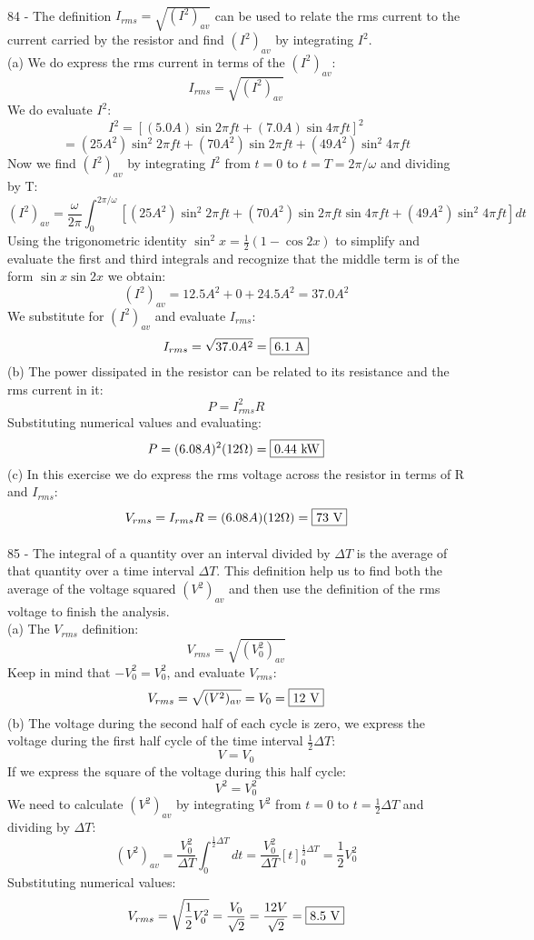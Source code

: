 \documentclass{report}
\begin{document}
\paragraph{}
84 - The definition $I_{rms} = \sqrt{(I^2)_{av}}$ can be used to relate the rms current to the current carried by the resistor and find $(I^2)_{av}$ by integrating $I^2$.\\
(a) We do express the rms current in terms of the $(I^2)_{av}$:
$$I_{rms} = \sqrt{(I^2)_{av}}$$
We do evaluate $I^2$:
$$I^2 = [(5.0 A) \sin 2 \pi ft + (7.0 A) \sin 4 \pi ft]^2$$
$$= (25 A^2) \sin^2 2 \pi ft + (70 A^2) \sin 2 \pi ft + (49 A^2) \sin^2 4 \pi ft$$
Now we find $(I^2)_{av}$ by integrating $I^2$ from $t =0$ to $t = T = 2 \pi / \omega$ and dividing by T:
$$(I^2)_{av} = \frac{\omega}{2 \pi}\int_0^{2 \pi / \omega}[(25 A^2) \sin^2 2 \pi ft + (70 A^2) \sin 2 \pi ft \sin 4 \pi ft + (49 A^2) \sin^2 4 \pi ft]dt$$
Using the trigonometric identity $\sin^2 x = \frac{1}{2}(1 - \cos 2x)$ to simplify and evaluate the first and third integrals and recognize that the middle term is of the form $\sin x \sin 2x$ we obtain:
$$(I^2)_{av} = 12.5 A^2 + 0 + 24.5 A^2 = 37.0 A^2$$
We substitute for $(I^2)_{av}$ and evaluate $I_{rms}$:
$$I_{rms} = \sqrt{37.0 A^2} = \fbox{6.1 A}$$
(b) The power dissipated in the resistor can be related to its resistance and the rms current in it:
$$P = I_{rms}^2 R$$
Substituting numerical values and evaluating:
$$P = (6.08 A)^2(12 \Omega) = \fbox{0.44 kW}$$
(c) In this exercise we do express the rms voltage across the resistor in terms of R and $I_{rms}$:
$$V_{rms} = I_{rms}R = (6.08 A)(12 \Omega) = \fbox{73 V}$$

\paragraph{}
85 - The integral of a quantity over an interval divided by $\Delta T$ is the average of that quantity over a time interval $\Delta T$. This definition help us to find both the average of the voltage squared $(V^2)_{av}$ and then use the definition of the rms voltage to finish the analysis.\\
(a) The $V_{rms}$ definition:
$$V_{rms} = \sqrt{(V_0^2)_{av}}$$
Keep in mind that $-V_0^2 = V_0^2$, and evaluate $V_{rms}$:
$$V_{rms} = \sqrt{(V^2)_{av}} = V_0 = \fbox{12 V}$$
(b) The voltage during the second half of each cycle is zero, we express the voltage during the first half cycle of the time interval $\frac{1}{2}\Delta T$:
$$V = V_0$$
If we express the square of the voltage during this half cycle:
$$V^2 = V_0^2$$
We need to calculate $(V^2)_{av}$ by integrating $V^2$ from $t = 0$ to $t = \frac{1}{2}\Delta T$ and dividing by $\Delta T$:
$$(V^2)_{av} = \frac{V_0^2}{\Delta T} \int_0^{\frac{1}{2}\Delta T}dt = \frac{V_0^2}{\Delta T}[t]_0^{\frac{1}{2}\Delta T} = \frac{1}{2}V_0^2$$
Substituting numerical values:
$$V_{rms} = \sqrt{\frac{1}{2}V_0^2} = \frac{V_0}{\sqrt{2}} = \frac{12 V}{\sqrt{2}} = \fbox{8.5 V}$$
\end{document}
